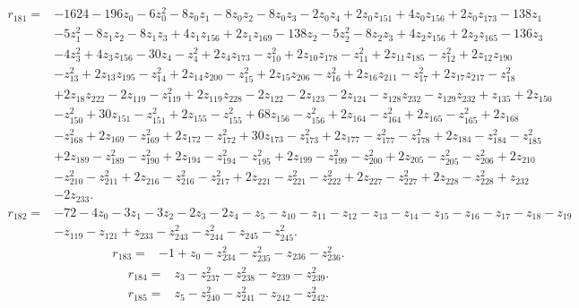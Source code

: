 \begin{align*}
 r_{181}={}&-1624-196z_{0}-6z_{0}^{2}-8z_{0}z_{1}-8z_{0}z_{2}-8z_{0}z_{3}-2z_{0}z_{4}+2z_{0}z_{151}+4z_{0}z_{156}+2z_{0}z_{173}-138z_{1}\\
 &-5z_{1}^{2}-8z_{1}z_{2}-8z_{1}z_{3}+4z_{1}z_{156}+2z_{1}z_{169}-138z_{2}-5z_{2}^{2}-8z_{2}z_{3}+4z_{2}z_{156}+2z_{2}z_{165}-136z_{3}\\
 &-4z_{3}^{2}+4z_{3}z_{156}-30z_{4}-z_{4}^{2}+2z_{4}z_{173}-z_{10}^{2}+2z_{10}z_{178}-z_{11}^{2}+2z_{11}z_{185}-z_{12}^{2}+2z_{12}z_{190}\\
 &-z_{13}^{2}+2z_{13}z_{195}-z_{14}^{2}+2z_{14}z_{200}-z_{15}^{2}+2z_{15}z_{206}-z_{16}^{2}+2z_{16}z_{211}-z_{17}^{2}+2z_{17}z_{217}-z_{18}^{2}\\
 &+2z_{18}z_{222}-2z_{119}-z_{119}^{2}+2z_{119}z_{228}-2z_{122}-2z_{123}-2z_{124}-z_{128}z_{232}-z_{129}z_{232}+z_{135}+2z_{150}\\
 &-z_{150}^{2}+30z_{151}-z_{151}^{2}+2z_{155}-z_{155}^{2}+68z_{156}-z_{156}^{2}+2z_{164}-z_{164}^{2}+2z_{165}-z_{165}^{2}+2z_{168}\\
 &-z_{168}^{2}+2z_{169}-z_{169}^{2}+2z_{172}-z_{172}^{2}+30z_{173}-z_{173}^{2}+2z_{177}-z_{177}^{2}-z_{178}^{2}+2z_{184}-z_{184}^{2}-z_{185}^{2}\\
 &+2z_{189}-z_{189}^{2}-z_{190}^{2}+2z_{194}-z_{194}^{2}-z_{195}^{2}+2z_{199}-z_{199}^{2}-z_{200}^{2}+2z_{205}-z_{205}^{2}-z_{206}^{2}+2z_{210}\\
 &-z_{210}^{2}-z_{211}^{2}+2z_{216}-z_{216}^{2}-z_{217}^{2}+2z_{221}-z_{221}^{2}-z_{222}^{2}+2z_{227}-z_{227}^{2}+2z_{228}-z_{228}^{2}+z_{232}\\
 &-2z_{233} .
\end{align*}
\begin{align*}
 r_{182}={}&-72-4z_{0}-3z_{1}-3z_{2}-2z_{3}-2z_{4}-z_{5}-z_{10}-z_{11}-z_{12}-z_{13}-z_{14}-z_{15}-z_{16}-z_{17}-z_{18}-z_{19}\\
 &-z_{119}-z_{121}+z_{233}-z_{243}^{2}-z_{244}^{2}-z_{245}-z_{245}^{2} .
\end{align*}
\begin{align*}
 r_{183}={}&-1+z_{0}-z_{234}^{2}-z_{235}^{2}-z_{236}-z_{236}^{2} .
\end{align*}
\begin{align*}
 r_{184}={}&z_{3}-z_{237}^{2}-z_{238}^{2}-z_{239}-z_{239}^{2} .
\end{align*}
\begin{align*}
 r_{185}={}&z_{5}-z_{240}^{2}-z_{241}^{2}-z_{242}-z_{242}^{2} .
\end{align*}
